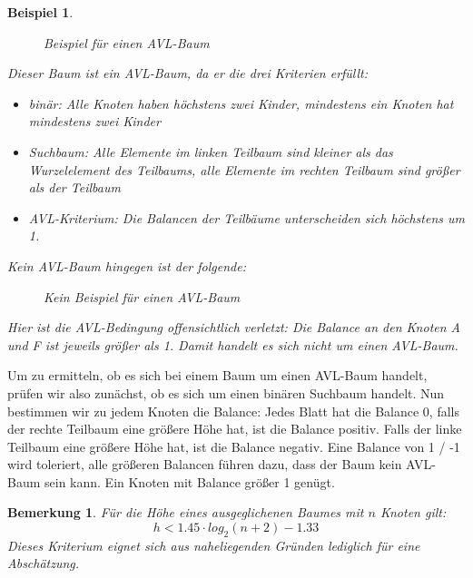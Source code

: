 \documentclass[11pt,a4paper]{scrartcl}
\newtheorem{note}{Bemerkung}
\newtheorem{example}{Beispiel}
\begin{document}
\begin{example}
\begin{figure}[h!]
\centering
{}
\caption{Beispiel für einen AVL-Baum}
\end{figure}
Dieser Baum ist ein AVL-Baum, da er die drei Kriterien erfüllt:
\begin{itemize}
\item binär: Alle Knoten haben höchstens zwei Kinder, mindestens ein Knoten hat mindestens zwei Kinder
\item Suchbaum: Alle Elemente im linken Teilbaum sind kleiner als das Wurzelelement des Teilbaums, alle Elemente im rechten Teilbaum sind größer als der Teilbaum
\item AVL-Kriterium: Die Balancen der Teilbäume unterscheiden sich höchstens um 1.
\end{itemize}
Kein AVL-Baum hingegen ist der folgende:
\begin{figure}[h!]
\centering
{}
\caption{Kein Beispiel für einen AVL-Baum}
\end{figure}
Hier ist die AVL-Bedingung offensichtlich verletzt: Die Balance an den Knoten A und F ist jeweils größer als 1. Damit handelt es sich nicht um einen AVL-Baum.
\end{example}
Um zu ermitteln, ob es sich bei einem Baum um einen AVL-Baum handelt, prüfen wir also zunächst, ob es sich um einen binären Suchbaum handelt. Nun bestimmen wir zu jedem Knoten die Balance: Jedes Blatt hat die Balance 0, falls der rechte Teilbaum eine größere Höhe hat, ist die Balance positiv. Falls der linke Teilbaum eine größere Höhe hat, ist die Balance negativ. Eine Balance von 1 / -1 wird toleriert, alle größeren Balancen führen dazu, dass der Baum kein AVL-Baum sein kann. Ein Knoten mit Balance größer 1 genügt.
\begin{note}
Für die Höhe eines ausgeglichenen Baumes mit $n$ Knoten gilt:
\[h < 1.45 \cdot log_2(n+2) - 1.33\]
Dieses Kriterium eignet sich aus naheliegenden Gründen lediglich für eine Abschätzung. 
\end{note}
\end{document}
